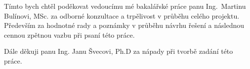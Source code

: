 
\begin{acknowledgements}
\vspace{1cm}

Tímto bych chtěl poděkovat vedoucímu mé bakalářské práce panu \mbox{Ing. Martinu} Bulínovi, MSc. za odborné konzultace a trpělivost v průběhu celého projektu. Především za hodnotné rady a poznámky v průběhu návrhu řešení a následnou cennou zpětnou vazbu při psaní této práce. \par
Dále děkuji panu Ing. Janu Švecovi, Ph.D za nápady při tvorbě zadání této práce. \par

\end{acknowledgements}